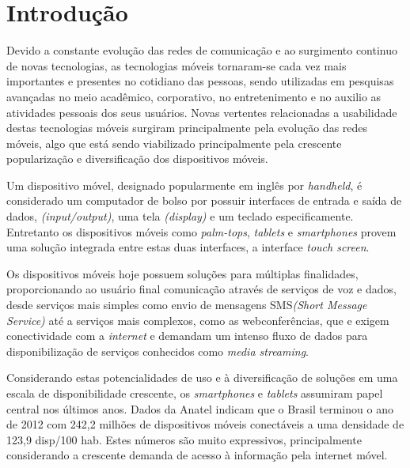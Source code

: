\chapter{Introdução} %
Devido a constante evolução das redes de comunicação e ao surgimento continuo de
novas tecnologias, as tecnologias móveis tornaram-se cada vez mais importantes e
presentes no cotidiano das pessoas, sendo utilizadas em pesquisas avançadas no
meio acadêmico, corporativo, no entretenimento e no auxilio as atividades
pessoais dos seus usuários. Novas vertentes relacionadas a usabilidade
destas tecnologias móveis surgiram principalmente pela evolução das redes móveis,
algo que está sendo viabilizado principalmente pela crescente popularização e
diversificação dos dispositivos móveis.

Um dispositivo móvel, designado popularmente em inglês por \textit{handheld}, é
considerado um computador de bolso por possuir interfaces de entrada e saída
de dados, \textit{(input/output)}, uma tela \textit{(display)} e um teclado
especificamente. Entretanto os dispositivos móveis como \textit{palm-tops}, \textit{tablets}
e \textit{smartphones} provem uma solução integrada entre estas duas interfaces,
a interface \textit{touch screen}.

Os dispositivos móveis hoje possuem soluções para múltiplas finalidades, proporcionando
ao usuário final comunicação através de serviços de voz e dados, desde serviços
mais simples como envio de mensagens SMS\textit{(Short Message Service)}
até a serviços mais complexos, como as webconferências, que e exigem conectividade
com a \textit{internet} e demandam um intenso fluxo de dados para
disponibilização de serviços conhecidos como \textit{media streaming}.

Considerando estas potencialidades de uso e à diversificação de soluções em uma
escala de disponibilidade crescente, os \textit{smartphones} e \textit{tablets}
assumiram papel central nos últimos anos. Dados da Anatel indicam que o Brasil
terminou o ano de 2012 com 242,2 milhões de dispositivos móveis conectáveis
a uma densidade de 123,9 disp/100 hab. Estes números são muito expressivos,
principalmente considerando a crescente demanda de acesso à informação pela internet móvel.

